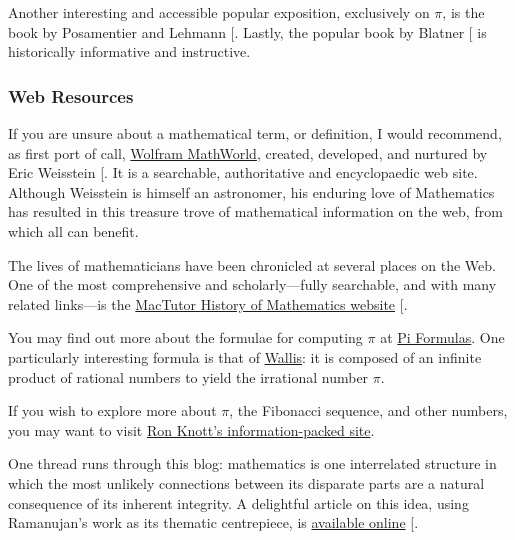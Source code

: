 \documentclass[
  a4paper,
]{article}
\begin{document}
Another interesting and accessible popular exposition, exclusively on
\(\pi\), is the book by Posamentier and Lehmann
{[}\citeproc{ref-pos-leh-2004}{48}{]}. Lastly, the popular book by
Blatner {[}\citeproc{ref-blatner-1997}{46}{]} is historically
informative and instructive.

\subsubsection{Web Resources}\label{web-resources}

If you are unsure about a mathematical term, or definition, I would
recommend, as first port of call,
\href{https://mathworld.wolfram.com/}{Wolfram MathWorld}, created,
developed, and nurtured by Eric Weisstein
{[}\citeproc{ref-mathworld}{49}{]}. It is a searchable, authoritative
and encyclopaedic web site. Although Weisstein is himself an astronomer,
his enduring love of Mathematics has resulted in this treasure trove of
mathematical information on the web, from which all can benefit.

The lives of mathematicians have been chronicled at several places on
the Web. One of the most comprehensive and scholarly---fully searchable,
and with many related links---is the
\href{https://mathshistory.st-andrews.ac.uk/}{MacTutor History of
Mathematics website} {[}\citeproc{ref-mactutor}{50}{]}.

You may find out more about the formulae for computing \(\pi\) at
\href{https://mathworld.wolfram.com/PiFormulas.html}{Pi Formulas}. One
particularly interesting formula is that of
\href{https://mathworld.wolfram.com/WallisFormula.html}{Wallis}: it is
composed of an infinite product of rational numbers to yield the
irrational number \(\pi\).

If you wish to explore more about \(\pi\), the Fibonacci sequence, and
other numbers, you may want to visit
\href{https://r-knott.surrey.ac.uk/fibonacci/fibpi.html\%7D\%7BRon\%20Knott's\%20information-packed\%20site}{Ron
Knott's information-packed site}.

One thread runs through this blog: mathematics is one interrelated
structure in which the most unlikely connections between its disparate
parts are a natural consequence of its inherent integrity. A delightful
article on this idea, using Ramanujan's work as its thematic
centrepiece, is
\href{https://www.quantamagazine.org/srinivasa-ramanujan-was-a-genius-math-is-still-catching-up-20241021/}{available
online} {[}\citeproc{ref-ramanujan-quanta}{51}{]}.
\end{document}
